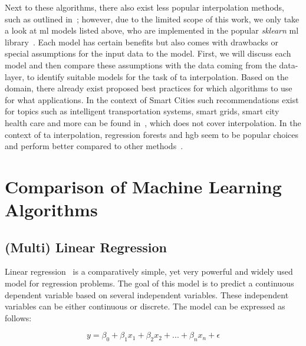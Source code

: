 Next to these algorithms, there also exist less popular interpolation methods, such as outlined in~\cite{li2014spatial}; however, due to the limited scope of this work, we only take a look at \gls{ml} models listed above, who are implemented in the popular \textit{sklearn} \gls{ml} library~\cite{scikit-learn}.
Each model has certain benefits but also comes with drawbacks or special assumptions for the input data to the model. First, we will discuss each model and then compare these assumptions with the data coming from the data-layer, to identify suitable models for the task of \gls{ta} interpolation.
Based on the domain, there already exist proposed best practices for which algorithms to use for what applications. In the context of Smart Cities such recommendations exist for topics such as intelligent transportation systems, smart grids, smart city health care and more can be found in~\cite{ullah2020applications}, which does not cover interpolation. In the context of \gls{ta} interpolation, regression forests and \gls{hgb} seem to be popular choices and perform better compared to other methods~\cite{apaydin2022evaluation, ho2014mapping}.

\section{Comparison of Machine Learning Algorithms}
\label{sec:comparison ml algorithms}

\subsection{(Multi) Linear Regression}
\label{subsec: linear regression}

Linear regression~\cite{montgomery2021introduction} is a comparatively simple, yet very powerful and widely used model for regression problems. The goal of this model is to predict a continuous dependent variable based on several independent variables. These independent variables can be either continuous or discrete. The model can be expressed as follows:

\begin{equation}
    y = \beta_0 + \beta_1 x_1 + \beta_2 x_2 + ... + \beta_n x_n + \epsilon
\end{equation}

